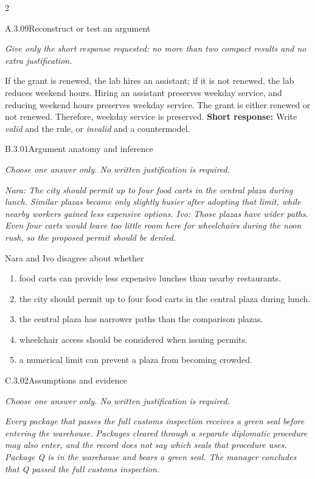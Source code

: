 \documentclass[9pt]{extarticle}
\newcommand{\choice}[1]{\item #1}
\begin{document}
\CoreWorkArea
\FormBreak
{}
\begin{multicols}{2}
\begin{DenseCoreProblem}{A.3.09}{Reconstruct or test an argument}
{\scriptsize\textit{Give only the short response requested: no more than two compact results and no extra justification.}\par}
If the grant is renewed, the lab hires an assistant; if it is not renewed, the lab reduces weekend hours. Hiring an assistant preserves weekday service, and reducing weekend hours preserves weekday service. The grant is either renewed or not renewed. Therefore, weekday service is preserved.
\textbf{Short response:} Write \emph{valid} and the rule, or \emph{invalid} and a countermodel.
\end{DenseCoreProblem}
\begin{DenseCoreProblem}{B.3.01}{Argument anatomy and inference}
{\scriptsize\textit{Choose one answer only. No written justification is required.}\par}
\emph{Nara: The city should permit up to four food carts in the central plaza during lunch. Similar plazas became only slightly busier after adopting that limit, while nearby workers gained less expensive options. Ivo: Those plazas have wider paths. Even four carts would leave too little room here for wheelchairs during the noon rush, so the proposed permit should be denied.}

Nara and Ivo disagree about whether
\begin{enumerate}[label=(\alph*)]
  \choice{food carts can provide less expensive lunches than nearby restaurants.}
  \choice{the city should permit up to four food carts in the central plaza during lunch.}
  \choice{the central plaza has narrower paths than the comparison plazas.}
  \choice{wheelchair access should be considered when issuing permits.}
  \choice{a numerical limit can prevent a plaza from becoming crowded.}
\end{enumerate}
\end{DenseCoreProblem}
\columnbreak
\begin{DenseCoreProblem}{C.3.02}{Assumptions and evidence}
{\scriptsize\textit{Choose one answer only. No written justification is required.}\par}
\emph{Every package that passes the full customs inspection receives a green seal before entering the warehouse. Packages cleared through a separate diplomatic procedure may also enter, and the record does not say which seals that procedure uses. Package Q is in the warehouse and bears a green seal. The manager concludes that Q passed the full customs inspection.}


\end{DenseCoreProblem}
\end{multicols}
\end{document}

